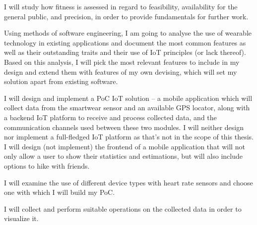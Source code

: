 I will study how fitness is assessed in regard to feasibility, availability for the general public, and precision, in order to provide fundamentals for further work.

Using methods of software engineering, I am going to analyse the use of wearable technology in existing applications and document the most common features as well as their outstanding traits and their use of IoT principles (or lack thereof).
Based on this analysis, I will pick the most relevant features to include in my design and extend them with features of my own devising, which will set my solution apart from existing software.

I will design and implement a PoC IoT solution -- a mobile application which will collect data from the smartwear sensor and an available GPS locator, along with a backend IoT platform to receive and process collected data, and the communication channels used between these two modules.
I will neither design nor implement a full-fledged IoT platform as that's not in the scope of this thesis.
I will design (not implement) the frontend of a mobile application that will not only allow a user to show their statistics and estimations, but will also include options to hike with friends.

I will examine the use of different device types with heart rate sensors and choose one with which I will build my PoC.

I will collect and perform suitable operations on the collected data in order to visualize it.
